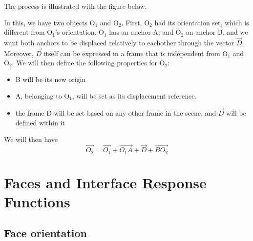 The process is illustrated with the figure below.
\begin{center}
\end{center}
In this, we have two objects O$_1$ and O$_2$. First, O$_2$ had its orientation set, which is different from O$_1$'s orientation. O$_1$ has an anchor A, and O$_2$ an anchor B, and we want both anchors to be displaced relatively to eachother through the vector $\vec D$. Moreover, $\vec D$ itself can be expressed in a frame that is independent from O$_1$ and O$_2$. We will then define the following properties for O$_2$:
\begin{itemize}
	\item B will be its new origin
	\item A, belonging to O$_1$, will be set as its displacement reference.
	\item the frame D will be set based on any other frame in the scene, and $\vec D$ will be defined within it
\end{itemize}	
We will then have
\begin{equation}
	\vec{O_2}=\vec{O_1}+\vec{O_1 A} + \vec D+\vec{B O_2}
\end{equation}

\section{Faces and Interface Response Functions}

\label{faces_irfs}

\subsection{Face orientation}

